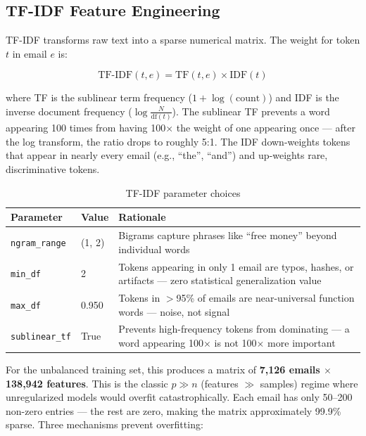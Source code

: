 \subsection{TF-IDF Feature Engineering}

TF-IDF transforms raw text into a sparse numerical matrix. The weight for token $t$ in email $e$ is:

\[
\text{TF-IDF}(t, e) = \text{TF}(t, e) \times \text{IDF}(t)
\]

where TF is the sublinear term frequency ($1 + \log(\text{count})$) and IDF is the inverse document frequency ($\log\frac{N}{\text{df}(t)}$). The sublinear TF prevents a word appearing 100 times from having 100$\times$ the weight of one appearing once — after the log transform, the ratio drops to roughly 5:1. The IDF down-weights tokens that appear in nearly every email (e.g., ``the'', ``and'') and up-weights rare, discriminative tokens.

\begin{table}[H]
\centering{}
\begin{tabular}{L{3.5cm} L{2.5cm} L{7.5cm}}
\toprule{}\color{white}\textbf{Parameter} &\color{white}\textbf{Value} &\color{white}\textbf{Rationale}\\
\midrule
\texttt{ngram\_range} & (1, 2) & Bigrams capture phrases like ``free money'' beyond individual words\\
\texttt{min\_df} & 2 & Tokens appearing in only 1 email are typos, hashes, or artifacts — zero statistical generalization value\\
\texttt{max\_df} & 0.950 & Tokens in $>$95\% of emails are near-universal function words — noise, not signal\\
\texttt{sublinear\_tf} & True & Prevents high-frequency tokens from dominating — a word appearing 100$\times$ is not 100$\times$ more important\\
\bottomrule
\end{tabular}
\caption{TF-IDF parameter choices}
\end{table}

For the unbalanced training set, this produces a matrix of \textbf{7,126 emails $\times$ 138,942 features}. This is the classic $p \gg n$ (features $\gg$ samples) regime where unregularized models would overfit catastrophically. Each email has only 50--200 non-zero entries — the rest are zero, making the matrix approximately 99.9\% sparse. Three mechanisms prevent overfitting:

